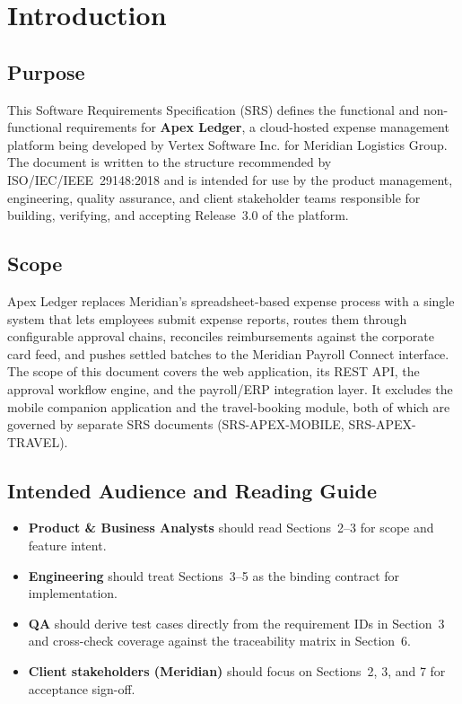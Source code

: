 \section{Introduction}

\subsection{Purpose}
This Software Requirements Specification (SRS) defines the functional and non-functional
requirements for \textbf{Apex Ledger}, a cloud-hosted expense management platform being
developed by Vertex Software Inc. for Meridian Logistics Group. The document is written to
the structure recommended by ISO/IEC/IEEE~29148:2018 \cite{ieee29148} and is intended for use
by the product management, engineering, quality assurance, and client stakeholder teams
responsible for building, verifying, and accepting Release~3.0 of the platform.

\subsection{Scope}
Apex Ledger replaces Meridian's spreadsheet-based expense process with a single system that
lets employees submit expense reports, routes them through configurable approval chains,
reconciles reimbursements against the corporate card feed, and pushes settled batches to the
Meridian Payroll Connect interface. The scope of this document covers the web application, its
REST API, the approval workflow engine, and the payroll/ERP integration layer. It excludes the
mobile companion application and the travel-booking module, both of which are governed by
separate SRS documents (SRS-APEX-MOBILE, SRS-APEX-TRAVEL).

\subsection{Intended Audience and Reading Guide}
\begin{itemize}[leftmargin=1.4em]
  \item \textbf{Product \& Business Analysts} should read Sections~2--3 for scope and feature intent.
  \item \textbf{Engineering} should treat Sections~3--5 as the binding contract for implementation.
  \item \textbf{QA} should derive test cases directly from the requirement IDs in Section~3 and
        cross-check coverage against the traceability matrix in Section~6.
  \item \textbf{Client stakeholders (Meridian)} should focus on Sections~2, 3, and 7 for
        acceptance sign-off.
\end{itemize}

